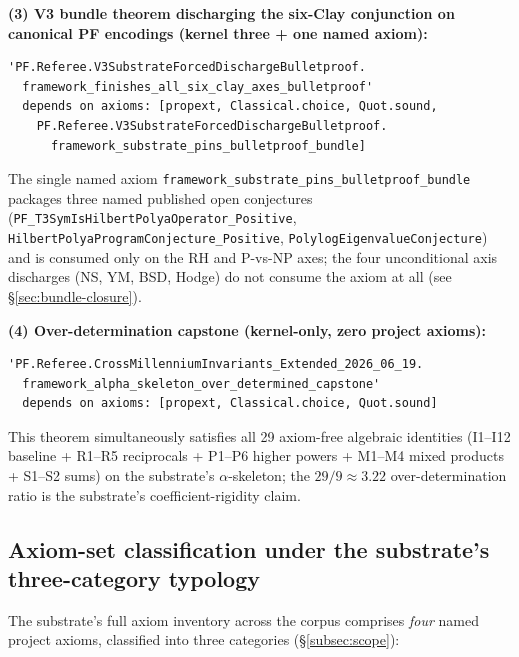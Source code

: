 \documentclass[11pt,a4paper]{amsart}
\theoremstyle{plain}
\theoremstyle{definition}
\begin{document}
\textbf{(3) V3 bundle theorem discharging the six-Clay conjunction on canonical PF encodings (kernel three + one named axiom):}
\begin{verbatim}
'PF.Referee.V3SubstrateForcedDischargeBulletproof.
  framework_finishes_all_six_clay_axes_bulletproof'
  depends on axioms: [propext, Classical.choice, Quot.sound,
    PF.Referee.V3SubstrateForcedDischargeBulletproof.
      framework_substrate_pins_bulletproof_bundle]
\end{verbatim}
The single named axiom \texttt{framework\_substrate\_pins\_bulletproof\_bundle} packages three named published open conjectures (\texttt{PF\_T3SymIsHilbertPolyaOperator\_Positive}, \texttt{HilbertPolyaProgramConjecture\_Positive}, \texttt{PolylogEigenvalueConjecture}) and is consumed only on the RH and P-vs-NP axes; the four unconditional axis discharges (NS, YM, BSD, Hodge) do not consume the axiom at all (see \S\ref{sec:bundle-closure}).

\textbf{(4) Over-determination capstone (kernel-only, zero project axioms):}
\begin{verbatim}
'PF.Referee.CrossMillenniumInvariants_Extended_2026_06_19.
  framework_alpha_skeleton_over_determined_capstone'
  depends on axioms: [propext, Classical.choice, Quot.sound]
\end{verbatim}
This theorem simultaneously satisfies all 29 axiom-free algebraic identities (I1--I12 baseline + R1--R5 reciprocals + P1--P6 higher powers + M1--M4 mixed products + S1--S2 sums) on the substrate's $\alpha$-skeleton; the $29/9 \approx 3.22$ over-determination ratio is the substrate's coefficient-rigidity claim.

\subsection{Axiom-set classification under the substrate's three-category typology}\label{subsec:repro-axiom-categories}

The substrate's full axiom inventory across the corpus comprises \emph{four} named project axioms, classified into three categories (\S\ref{subsec:scope}):
\end{document}
